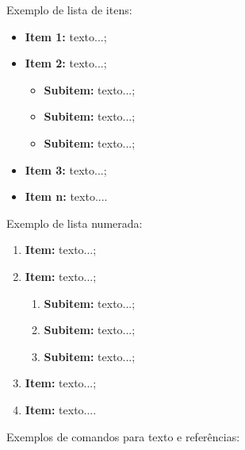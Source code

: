 \documentclass[
	article,
	11pt,
	oneside,
	a4paper,
	chapter=TITLE,
	section=TITLE,
	english,
	brazil,
	sumario=tradicional
]{abntex2}
\begin{document}
     
     Exemplo de lista de itens:
     
     \begin{itemize}
     	\item \textbf{Item 1:} texto...;
     	\item \textbf{Item 2:} texto...;
     	\begin{itemize}
     		\item \textbf{Subitem:} texto...;
     		\item \textbf{Subitem:} texto...;
     		\item \textbf{Subitem:} texto...;
     	\end{itemize}
     	\item \textbf{Item 3:} texto...;
     	\item \textbf{Item n:} texto....
     \end{itemize}
     
     
     Exemplo de lista numerada:
     
     \begin{enumerate}
     	\item \textbf{Item:} texto...;
     	\item \textbf{Item:} texto...;
     	\begin{enumerate}
     		\item \textbf{Subitem:} texto...;
     		\item \textbf{Subitem:} texto...;
     		\item \textbf{Subitem:} texto...;
     	\end{enumerate}
     	\item \textbf{Item:} texto...;
     	\item \textbf{Item:} texto....
     \end{enumerate}
     
     
     Exemplos de comandos para texto e referências:
     
\end{document}
